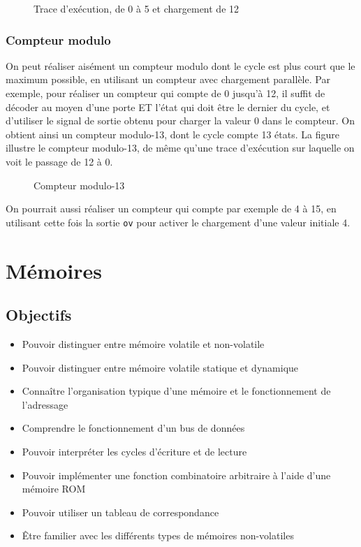 \documentclass[11pt]{article}
\begin{document}
\begin{figure}[htbp]
\centering

\caption{\label{fig:org6643cef}Trace d'exécution, de 0 à 5 et chargement de 12}
\end{figure}

\subsubsection{Compteur modulo}
\label{sec:org463a0d9}

On peut réaliser aisément un compteur modulo dont le cycle est plus
court que le maximum possible, en utilisant un compteur avec
chargement parallèle.  Par exemple, pour réaliser un compteur qui
compte de 0 jusqu'à 12, il suffit de décoder au moyen d'une porte ET
l'état qui doit être le dernier du cycle, et d'utiliser le signal de
sortie obtenu pour charger la valeur 0 dans le compteur. On obtient
ainsi un compteur modulo-13, dont le cycle compte 13 états.  La figure
illustre le compteur modulo-13, de même qu'une trace d'exécution sur
laquelle on voit le passage de 12 à 0.

\begin{figure}[htbp]
\centering

\caption{\label{fig:org84b48f1}Compteur modulo-13}
\end{figure}

On pourrait aussi réaliser un compteur qui compte par exemple de 4 à
15, en utilisant cette fois la sortie \texttt{ov} pour activer le chargement
d'une valeur initiale 4.

\section{Mémoires}
\label{sec:org3dccedf}
\subsection{Objectifs}
\label{sec:orga15f278}
\begin{itemize}
\item Pouvoir distinguer entre mémoire volatile et non-volatile
\item Pouvoir distinguer entre mémoire volatile statique et dynamique
\item Connaître l'organisation typique d'une mémoire et le fonctionnement
de l'adressage
\item Comprendre le fonctionnement d'un bus de données
\item Pouvoir interpréter les cycles d'écriture et de lecture
\item Pouvoir implémenter une fonction combinatoire arbitraire à l'aide d'une
mémoire ROM
\item Pouvoir utiliser un tableau de correspondance
\item Être familier avec les différents types de mémoires non-volatiles
\end{itemize}
\end{document}
